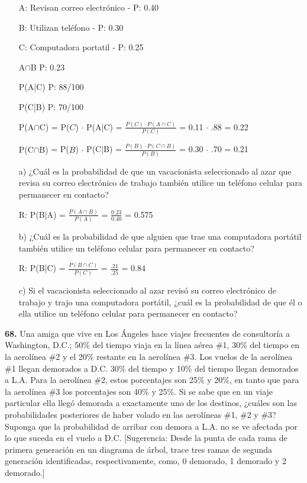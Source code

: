 \documentclass[12pt, letterpaper, spanish]{article}
\begin{document}
\begin{itemize}
    \item[A:] Revisan correo electrónico - P: 0.40
    \item[B:] Utilizan tel\'efono - P: 0.30
    \item[C:] Computadora portatil - P: 0.25
    \item[A$\cap$B] P: 0.23
    \item[P(A|C)] P: 88/100
    \item[P(C|B)] P: 70/100
    \item[P(A$\cap$C)] = P($C$) $\cdot$ P(A|C) = $\displaystyle\frac{P(C)\cdot P(A \cap C)}{P(C)}$ =  0.11 $\cdot$ .88 = 0.22
    \item[P(C$\cap$B)] = P($B$) $\cdot$ P(C|B) = $\displaystyle\frac{P(B)\cdot P(C \cap B)}{P(B)}$ =  0.30 $\cdot$ .70 = 0.21
    \item[a)] ¿Cuál es la probabilidad de que un vacacionista seleccionado al azar que revisa su correo electrónico de trabajo también utilice un teléfono celular para permanecer en contacto?
    \item[R:]  P(B|A) = $\displaystyle\frac{P(A\cap B)}{P(A)}$ = $\displaystyle\frac{0.23}{0.40}$ = 0.575
    \item[b)] ¿Cuál es la probabilidad de que alguien que trae una computadora portátil también utilice un teléfono celular para permanecer en contacto? 
    \item[R:] P(B|C) = $\displaystyle\frac{P(B\cap C)}{P(C)}$ = $\displaystyle\frac{.21}{.25}$ = 0.84 
    \item[c)] Si el vacacionista seleccionado al azar revisó su correo electrónico de trabajo y trajo una computadora portátil, ¿cuál es la probabilidad de que él o ella utilice un teléfono celular para permanecer en contacto?
\end{itemize}
\textbf{68.} Una amiga que vive en Los Ángeles hace viajes frecuentes de consultoría a Washington, D.C.; 50\% del tiempo viaja en la línea aérea \#1, 30\% del tiempo en la aerolínea \#2 y el 20\% restante en la aerolínea \#3. Los vuelos de la aerolínea \#1 llegan demorados a D.C. 30\% del tiempo y 10\% del tiempo llegan demorados a L.A. Para la aerolínea \#2, estos porcentajes son 25\% y 20\%, en tanto que para la aerolínea \#3 los porcentajes son 40\% y 25\%. Si se sabe que en un viaje particular ella llegó demorada a exactamente uno de los destinos, ¿cuáles son las probabilidades posteriores de haber volado en las aerolíneas \#1, \#2 y \#3? Suponga que la probabilidad de arribar con demora a L.A. no se ve afectada por lo que suceda en el vuelo a D.C. [Sugerencia: Desde la punta de cada rama de primera generación en un diagrama de árbol, trace tres ramas de segunda generación identificadas, respectivamente, como, 0 demorado, 1 demorado y 2 demorado.]
\end{document}

